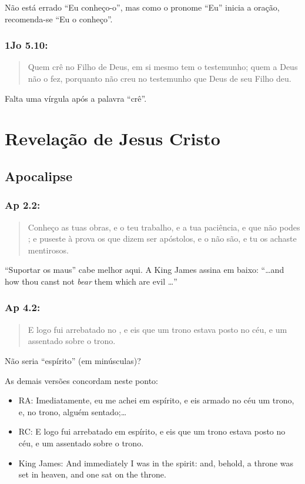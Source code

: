 Não está errado ``Eu conheço-o'', mas como o pronome ``Eu'' inicia a oração, recomenda-se ``Eu o conheço''.

\subsection*{1Jo 5.10:}
\begin{quote}
    \small
Quem crê no Filho de Deus, em si mesmo tem o
testemunho; quem a Deus não  o fez, porquanto não creu no testemunho que Deus de seu Filho deu.
\end{quote}

Falta uma vírgula após a palavra ``crê''.

\chapter{Revelação de Jesus Cristo}
\section{Apocalipse}
\subsection*{Ap 2.2:}
\begin{quote}
    \small
Conheço as tuas obras, e o teu trabalho, e a tua
 paciência, e que não podes ; e puseste à prova
 os que dizem ser apóstolos, e o não são, e tu os achaste
 mentirosos.
\end{quote}

``Suportar os maus'' cabe melhor aqui. A King James assina em baixo: ``\ldots{}and how thou canst not \emph{bear} them which are evil \ldots''

\subsection*{Ap 4.2:}
\begin{quote}
    \small
E logo fui arrebatado no , e eis que um trono estava posto no céu, e um assentado sobre o trono.
\end{quote}

Não seria ``espírito'' (em minúsculas)?

As demais versões concordam neste ponto:
\begin{itemize}
\item RA: Imediatamente, eu me achei em espírito, e eis armado no céu um
trono, e, no trono, alguém sentado;\ldots
\item RC: E logo fui arrebatado em espírito, e eis que um trono estava
posto no céu, e um assentado sobre o trono.
\item King James: And immediately I was in the spirit: and, behold, a throne was set in heaven, and one sat on the throne.
\end{itemize}

